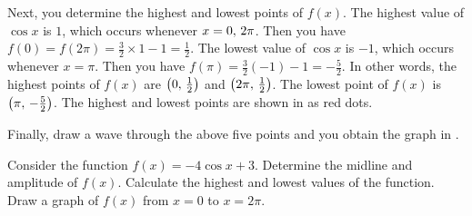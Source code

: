 \documentclass[a4paper,oneside,12pt]{article}
\begin{document}
{\begin{solution}
Next, you determine the highest and lowest points of $f(x)$.  The
highest value of $\cos x$ is $1$, which occurs whenever
$x = {0},\, {2\pi}$.  Then you have
$f(0) = f(2\pi) = \frac{3}{2} \times 1 - 1 = \frac{1}{2}$.  The lowest
value of $\cos x$ is $-1$, which occurs whenever $x = \pi$.  Then you
have $f(\pi) = \frac{3}{2} (-1) - 1 = -\frac{5}{2}$.  In other words,
the highest points of $f(x)$ are $\left\lparen{0},\, {\frac{1}{2}}\right\rparen$ and
$\left\lparen{2\pi},\, {\frac{1}{2}}\right\rparen$.  The lowest point of $f(x)$ is
$\left\lparen{\pi},\, {-\frac{5}{2}}\right\rparen$.  The highest and lowest points are shown
in  as red dots.

Finally, draw a wave through the above five points and you obtain the
graph in .
\end{solution}
}{}

\begin{exercise}
Consider the function $f(x) = -4 \cos x + 3$.  Determine the midline
and amplitude of $f(x)$.  Calculate the highest and lowest values of
the function.  Draw a graph of $f(x)$ from $x = 0$ to $x = 2\pi$.
\end{exercise}
\end{document}

